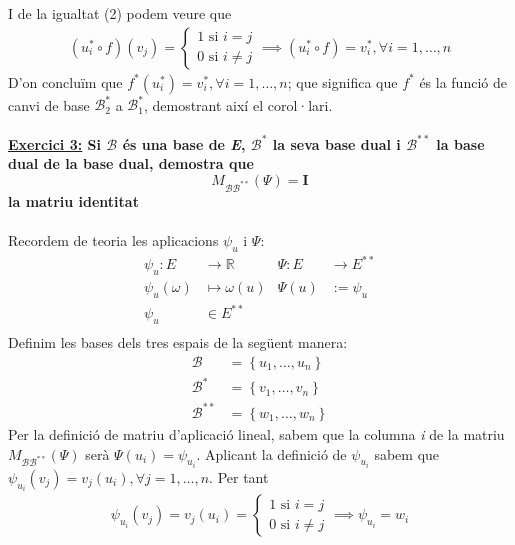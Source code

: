 \documentclass[a4paper, 11pt]{article}
\begin{document}
    I de la igualtat (2) podem veure que
    \begin{gather*}
        (u^*_i \circ f)(v_j) = 
        \begin{cases}
            1 \text{ si } i = j\\
            0 \text{ si } i \neq j
        \end{cases}
        \implies (u^*_i \circ f) = v^*_i, \forall i = 1,\dots,n
    \end{gather*}
    D'on conclu\"im que $ f^*(u^*_i)=v^*_i, \forall i = 1,\dots,n $; que significa que $ f^* $ \'es la funci\'o de canvi de base $\mathcal{B}_2^*$ a $ \mathcal{B}_1^* $, demostrant aix\'i el corol·lari.\\\\

    \noindent\textbf{ \large \underline{Exercici 3:}
    \normalsize
    Si $\mathcal{B}$ \'es una base de \emph{E}, $\mathcal{B}^*$ la seva base dual i $\mathcal{B}^{**}$ la base dual de la base dual, demostra que
    $$
        M_{\mathcal{B}\mathcal{B}^{**}}(\Psi) = \mathbf{I}
    $$
    la matriu identitat
    }\\\\
    Recordem de teoria les aplicacions $\psi_u$ i $\Psi$:
    \begin{align*}
        \psi_u: E &\longrightarrow \mathbb{R} & \Psi: E &\longrightarrow E^{**}\\
        \psi_u(\omega) &\mapsto \omega(u) & \Psi(u) &:= \psi_u\\
        \psi_u &\in E^{**}\\
    \end{align*}
    Definim les bases dels tres espais de la seg\"uent manera:
    \begin{align*}
        \mathcal{B} &= \left\{ u_1,\dots,u_n \right\}\\
        \mathcal{B}^* &= \left\{ v_1,\dots,v_n \right\}\\
        \mathcal{B}^{**} &= \left\{ w_1,\dots,w_n \right\}
    \end{align*}
    Per la definici\'o de matriu d'aplicaci\'o lineal, sabem que la columna \emph{i} de la matriu $ M_{\mathcal{B}\mathcal{B}^{**}}(\Psi) $ ser\`a $ \Psi(u_i) = \psi_{u_i} $. Aplicant la definici\'o de $ \psi_{u_i} $ sabem que $ \psi_{u_i}(v_j) = v_j(u_i), \forall j=1,\dots,n $. Per tant
    \begin{gather*}
        \psi_{u_i}(v_j) = v_j(u_i) = 
        \begin{cases}
            1 \text{ si } i = j\\
            0 \text{ si } i \neq j
        \end{cases}
        \implies \psi_{u_i} = w_i
    \end{gather*}
\end{document}
